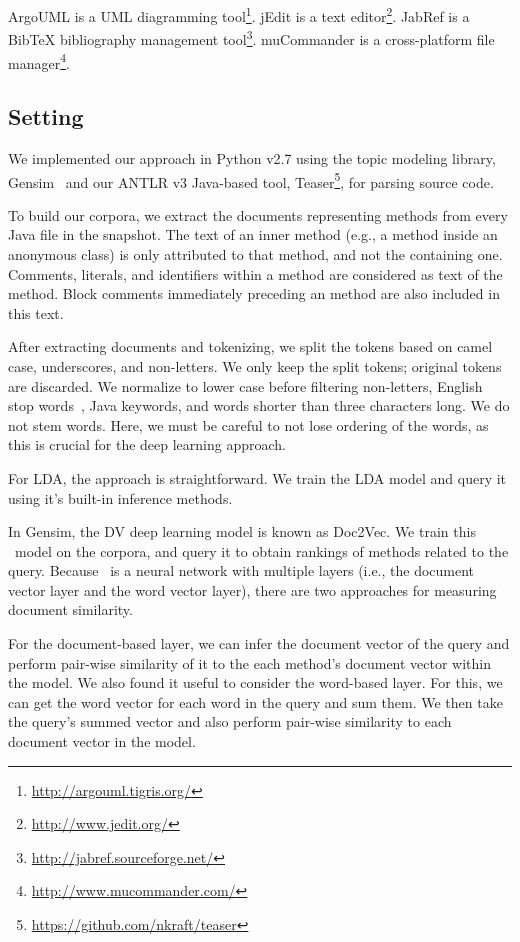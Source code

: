 ArgoUML is a UML diagramming tool\footnote{\url{http://argouml.tigris.org/}}.
jEdit is a text editor\footnote{\url{http://www.jedit.org/}}.
JabRef is a BibTeX bibliography management tool\footnote{\url{http://jabref.sourceforge.net/}}.
muCommander is a cross-platform file manager\footnote{\url{http://www.mucommander.com/}}.

\subsection{Setting}

We implemented our approach in Python v2.7 using the topic modeling library,
Gensim~\cite{Rehurek-Sojk_2010} and our ANTLR v3 Java-based tool,
Teaser\footnote{\url{https://github.com/nkraft/teaser}}, for parsing source
code.

To build our corpora, we extract the documents representing methods from every
Java file in the snapshot.  The text of an inner method (e.g., a method inside
an anonymous class) is only attributed to that method, and not the containing
one.  Comments, literals, and identifiers within a method are considered as text
of the method.  Block comments immediately preceding an method are also included
in this text.

After extracting documents and tokenizing, we split the tokens based on camel
case, underscores, and non-letters.  We only keep the split tokens; original
tokens are discarded.  We normalize to lower case before filtering non-letters,
English stop words~\cite{Fox_1992}, Java keywords, and words shorter than three
characters long.  We do not stem words. Here, we must be careful to not lose
ordering of the words, as this is crucial for the deep learning approach.

For LDA, the approach is straightforward. We train the LDA model and query it
using it's built-in inference methods.

In Gensim, the DV deep learning model is known as Doc2Vec.
We train this \dv\ model on the corpora, and query it to obtain rankings of
methods related to the query. Because \dv\ is a neural network with multiple
layers (i.e., the document vector layer and the word vector layer), there are two
approaches for measuring document similarity.

For the document-based layer, we can infer the document vector of the query and
perform pair-wise similarity of it to the each method's document vector within
the model.  We also found it useful to consider the word-based layer. For this,
we can get the word vector for each word in the query and sum them. We then take
the query's summed vector and also perform pair-wise similarity to each document
vector in the model.

